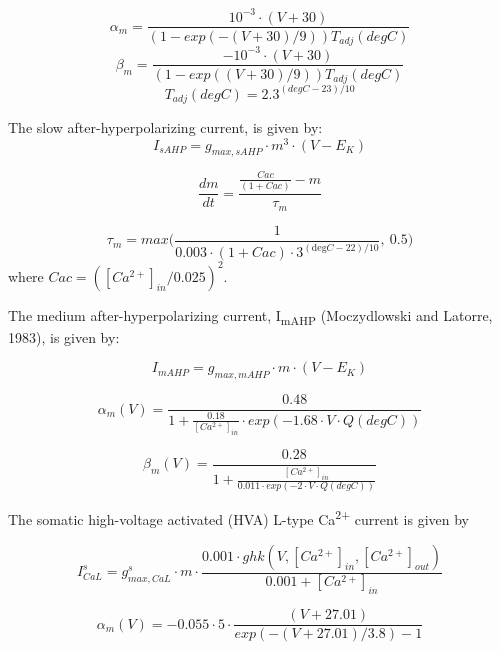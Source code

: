 \documentclass[12pt]{article}
\begin{document}
\begin{equation}
\alpha_m =  \frac{10^{-3}\cdot(V+30)}{(1-exp(-(V+30)/9))T_{adj}(degC)} 
\end{equation}
\begin{equation}
\beta_m = \frac{ -10^{-3}\cdot(V+30)}{(1-exp((V+30)/9))T_{adj}(degC)}
\end{equation}
\begin{equation}
T_{adj}(degC)=2.3^{(degC-23)/10}
\end{equation}


The slow after-hyperpolarizing current, is given by:
\begin{equation}
I_{sAHP}= g_{max, sAHP} \cdot m^3 \cdot (V-E_K)
\end{equation}

\begin{equation}
\frac{dm}{dt}=\frac{\frac{Cac}{(1+Cac)}-m}{\tau_m}
\end{equation}

\begin{equation}
\tau_m=max \Big(\frac {1}{0.003 \cdot (1+Cac)\cdot 3^{(\text{deg}C-22)/10}}, \ 0.5 \Big)
\end{equation}
where 
$Cac=([Ca^{2+}]_{in}/0.025)^2$.

The medium after-hyperpolarizing current, I\textsubscript{mAHP} (Moczydlowski and Latorre, 1983), is given by:

\begin{equation}
I_{mAHP}= g_{max, mAHP}\cdot m\cdot (V-E_K)
\end{equation}

\begin{equation}
\alpha_m(V)=\frac{0.48}{1+\frac{0.18}{[Ca^{2+}]_{in}}\cdot
	exp(-1.68\cdot V\cdot Q(degC))}
\end{equation}

\begin{equation}
\beta_m(V)=\frac{0.28}{1+\frac{[Ca^{2+}]_{in}}{0.011\cdot
		exp(-2\cdot V\cdot Q(degC))}}
\end{equation}

The somatic high-voltage activated (HVA) L-type Ca\textsuperscript{2+} current is given by


\begin{equation}
I_{CaL}^s= g_{max, CaL}^s\cdot m\cdot \frac{0.001 \cdot ghk(V, [Ca^{2+}]_{in}, [Ca^{2+}]_{out}) }{0.001 + [Ca^{2+}]_{in}}
\end{equation}

\begin{equation}
\alpha_m(V)=-0.055 \cdot 5 \cdot \frac{(V+27.01)}{exp(-(V+27.01)/3.8)-1}
\end{equation}
\end{document}
